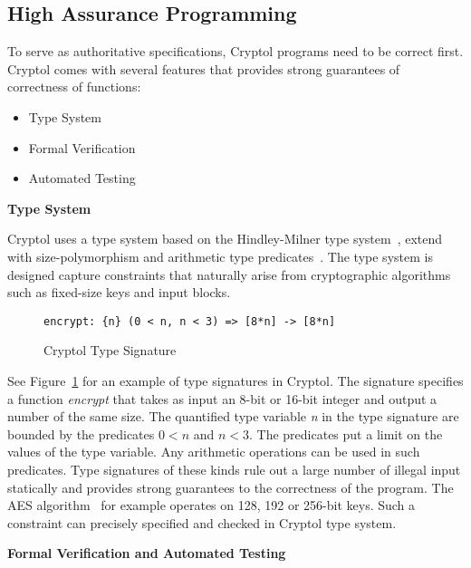 \documentclass[a4paper, notitlepage]{report}
\renewcommand{\paragraph}[1]{\vspace*{1em}\noindent\textbf{#1}\hspace*{1em}}
\begin{document}
\subsection{High Assurance Programming}

To serve as authoritative specifications, Cryptol programs need
to be correct first. Cryptol comes with several features that provides strong
guarantees of correctness of functions:
\begin{itemize}
\item Type System
\item Formal Verification 
\item Automated Testing
\end{itemize}

\paragraph{Type System}

Cryptol uses a type system based on the Hindley-Milner
type system~\cite{hindley1969principal}, extend with size-polymorphism
and arithmetic type predicates~\cite{lewis2003cryptol}. The type system
is designed capture constraints that naturally arise from cryptographic
algorithms such as fixed-size keys and input blocks.

\begin{figure}
\begin{lstlisting}[frame=single]
encrypt: {n} (0 < n, n < 3) => [8*n] -> [8*n]
\end{lstlisting}
\caption{Cryptol Type Signature}
\label{fig:type}
\end{figure}

See Figure~\ref{fig:type} for an example of type signatures in Cryptol.
The signature specifies a function \emph{encrypt} that takes as input
an 8-bit or 16-bit integer and output a number of the same size.
The quantified type variable \emph{n} in the type signature are bounded
by the predicates $ 0 < n$ and $n < 3$. The predicates put a limit on the
values of the type variable. Any arithmetic operations can be used in
such predicates.
Type signatures of these kinds rule out a large number of illegal input
statically and provides strong guarantees to the correctness of the program.
The AES algorithm~\cite{standard2001announcing} for example operates on 128, 192
or 256-bit keys. Such a constraint can precisely specified and checked in
Cryptol type system.

\paragraph{Formal Verification and Automated Testing}
\end{document}
